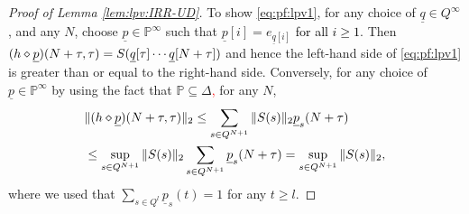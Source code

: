 \documentclass[10pt,a4paper]{amsart}
\begin{document}
\begin{proof}[Proof of Lemma \ref{lem:lpv:IRR-UD}]
        To show \eqref{eq:pf:lpv1}, for any choice of $\underline{q} \in Q^{\infty}$, and any $N$, choose $\underline{p} \in \mathbb{P}^{\infty}$ such that $\underline{p}[i]=e_{\underline{q}[i]}$ \textcolor{black}{for all $i \ge 1$}. Then 
        $(h \diamond \underline{p})(N+\tau,\tau)=S(\textcolor{black}{\underline{q}[\tau] \cdots \underline{q}[N+\tau]})$
        and hence the left-hand side of \eqref{eq:pf:lpv1} is greater than or equal to the right-hand side.
        Conversely, for any choice of $\underline{p} \in \mathbb{P}^{\infty}$
	  by using the fact that $\mathbb{P} \subseteq \Delta$\textcolor{red}{,}  for any $N$, %
        \[ 
          \begin{split}
             & \|(h \diamond \underline{p})(N+\tau,\tau)\|_2  \le \sum_{s \in Q^{N+1}} \|S(s)\|_2 \underline{p}_s(N+\tau) \\
            & \le \sup_{s \in Q^{N+1}} \|S(s)\|_2 \sum_{s \in Q^{N+1}} \underline{p}_s(N+\tau) =
            \sup_{s \in Q^{N+1}} \|S(s)\|_2 \textcolor{black}{,}
          \end{split}
        \]
        where we used that  $\sum_{s \in Q^l} \underline{p}_s(t) = 1$ for any $t \ge l$.
  \end{proof}
\end{document}
